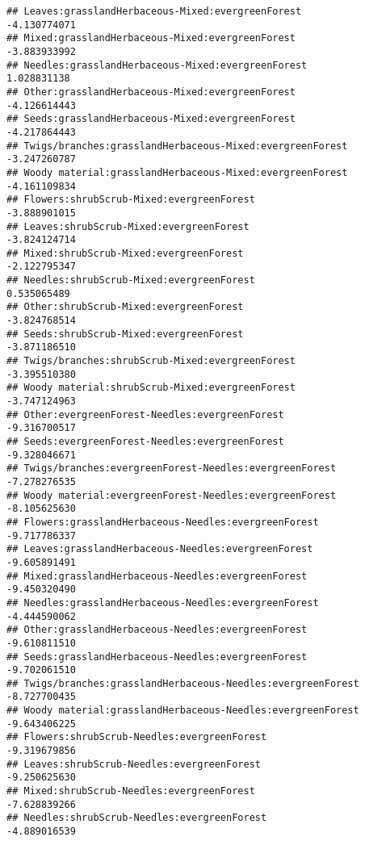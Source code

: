 \documentclass[
]{article}
\begin{document}
\begin{verbatim}
## Leaves:grasslandHerbaceous-Mixed:evergreenForest                      -4.130774071
## Mixed:grasslandHerbaceous-Mixed:evergreenForest                       -3.883933992
## Needles:grasslandHerbaceous-Mixed:evergreenForest                      1.028831138
## Other:grasslandHerbaceous-Mixed:evergreenForest                       -4.126614443
## Seeds:grasslandHerbaceous-Mixed:evergreenForest                       -4.217864443
## Twigs/branches:grasslandHerbaceous-Mixed:evergreenForest              -3.247260787
## Woody material:grasslandHerbaceous-Mixed:evergreenForest              -4.161109834
## Flowers:shrubScrub-Mixed:evergreenForest                              -3.888901015
## Leaves:shrubScrub-Mixed:evergreenForest                               -3.824124714
## Mixed:shrubScrub-Mixed:evergreenForest                                -2.122795347
## Needles:shrubScrub-Mixed:evergreenForest                               0.535065489
## Other:shrubScrub-Mixed:evergreenForest                                -3.824768514
## Seeds:shrubScrub-Mixed:evergreenForest                                -3.871186510
## Twigs/branches:shrubScrub-Mixed:evergreenForest                       -3.395510380
## Woody material:shrubScrub-Mixed:evergreenForest                       -3.747124963
## Other:evergreenForest-Needles:evergreenForest                         -9.316700517
## Seeds:evergreenForest-Needles:evergreenForest                         -9.328046671
## Twigs/branches:evergreenForest-Needles:evergreenForest                -7.278276535
## Woody material:evergreenForest-Needles:evergreenForest                -8.105625630
## Flowers:grasslandHerbaceous-Needles:evergreenForest                   -9.717786337
## Leaves:grasslandHerbaceous-Needles:evergreenForest                    -9.605891491
## Mixed:grasslandHerbaceous-Needles:evergreenForest                     -9.450320490
## Needles:grasslandHerbaceous-Needles:evergreenForest                   -4.444590062
## Other:grasslandHerbaceous-Needles:evergreenForest                     -9.610811510
## Seeds:grasslandHerbaceous-Needles:evergreenForest                     -9.702061510
## Twigs/branches:grasslandHerbaceous-Needles:evergreenForest            -8.727700435
## Woody material:grasslandHerbaceous-Needles:evergreenForest            -9.643406225
## Flowers:shrubScrub-Needles:evergreenForest                            -9.319679856
## Leaves:shrubScrub-Needles:evergreenForest                             -9.250625630
## Mixed:shrubScrub-Needles:evergreenForest                              -7.628839266
## Needles:shrubScrub-Needles:evergreenForest                            -4.889016539

\end{verbatim}
\end{document}
